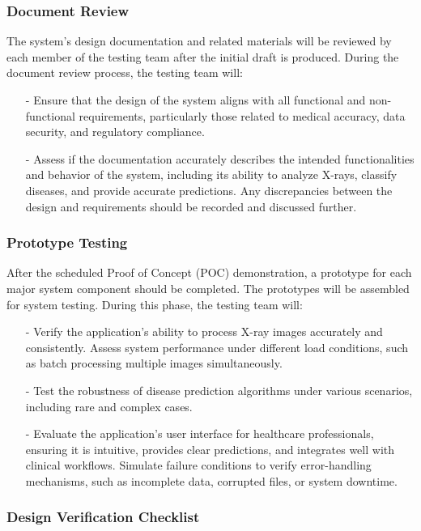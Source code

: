 \documentclass[12pt, titlepage]{article}
\begin{document}
\subsubsection{Document Review}
The system's design documentation and related materials will be reviewed by each member of the testing team after the initial draft is produced. During the document review process, the testing team will:
\begin{itemize}
\item[-] Ensure that the design of the system aligns with all functional and non-functional requirements, particularly those related to medical accuracy, data security, and regulatory compliance.
\item[-] Assess if the documentation accurately describes the intended functionalities and behavior of the system, including its ability to analyze X-rays, classify diseases, and provide accurate predictions. Any discrepancies between the design and requirements should be recorded and discussed further.
\end{itemize}

\subsubsection{Prototype Testing}
After the scheduled Proof of Concept (POC) demonstration, a prototype for each major system component should be completed. The prototypes will be assembled for system testing. During this phase, the testing team will:
\begin{itemize}
\item[-] Verify the application’s ability to process X-ray images accurately and consistently.
Assess system performance under different load conditions, such as batch processing multiple images simultaneously.
\item[-] Test the robustness of disease prediction algorithms under various scenarios, including rare and complex cases.
\item[-] Evaluate the application's user interface for healthcare professionals, ensuring it is intuitive, provides clear predictions, and integrates well with clinical workflows.
Simulate failure conditions to verify error-handling mechanisms, such as incomplete data, corrupted files, or system downtime.
\end{itemize}


\subsubsection{Design Verification Checklist}
\end{document}
